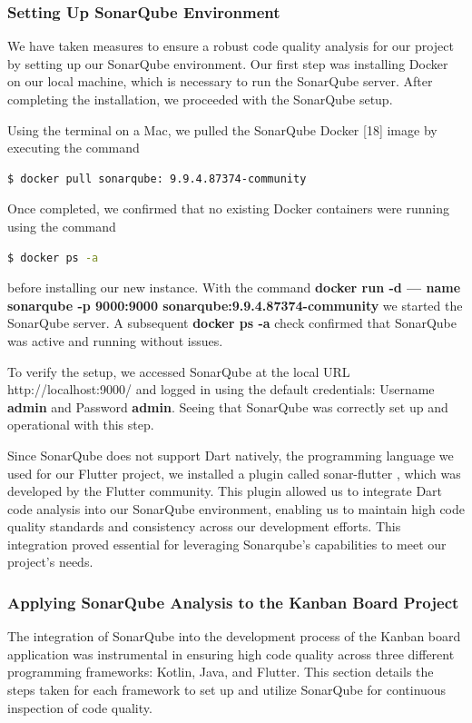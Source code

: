 \subsubsection{Setting Up SonarQube Environment}
We have taken measures to ensure a robust code quality analysis for our project by setting up our SonarQube environment. Our first step was installing Docker on our local machine, which is necessary to run the SonarQube server. After completing the installation, we proceeded with the SonarQube setup.
\par
Using the terminal on a Mac, we pulled the SonarQube Docker [18] image by executing the command 
\begin{lstlisting}[language=bash]
    $ docker pull sonarqube: 9.9.4.87374-community 
  \end{lstlisting}
Once completed, we confirmed that no existing Docker containers were running using the command 
\begin{lstlisting}[language=bash]
    $ docker ps -a 
\end{lstlisting}
before installing our new instance. With the command \textbf{docker run -d — name sonarqube -p 9000:9000 sonarqube:9.9.4.87374-community} we started the SonarQube server. A subsequent \textbf{docker ps -a} check confirmed that SonarQube was active and running without issues.
\par
To verify the setup, we accessed SonarQube at the local URL http://localhost:9000/ and logged in using the default credentials: Username \textbf{admin} and Password \textbf{admin}. Seeing that SonarQube was correctly set up and operational with this step.
\par
Since SonarQube does not support Dart natively, the programming language we used for our Flutter project, we installed a plugin called sonar-flutter \cite{flutter_sonar}, which was developed by the Flutter community. This plugin allowed us to integrate Dart code analysis into our SonarQube environment, enabling us to maintain high code quality standards and consistency across our development efforts. This integration proved essential for leveraging Sonarqube's capabilities to meet our project's needs.
\subsubsection{Applying SonarQube Analysis to the Kanban Board Project}
The integration of SonarQube into the development process of the Kanban board application was instrumental in ensuring high code quality across three different programming frameworks: Kotlin, Java, and Flutter. This section details the steps taken for each framework to set up and utilize SonarQube for continuous inspection of code quality.

